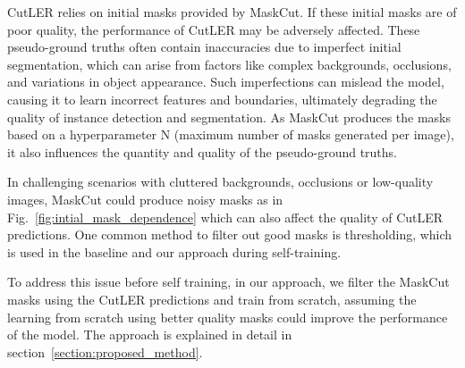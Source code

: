 CutLER relies on initial masks provided by MaskCut. If these initial masks are of poor quality, the performance of CutLER may be adversely affected. These pseudo-ground truths often contain inaccuracies due to imperfect initial segmentation, which can arise from factors like complex backgrounds, occlusions, and variations in object appearance. Such imperfections can mislead the model, causing it to learn incorrect features and boundaries, ultimately degrading the quality of instance detection and segmentation. As MaskCut produces the masks based on a hyperparameter N (maximum number of masks generated per image), it also influences the quantity and quality of the pseudo-ground truths.

In challenging scenarios with cluttered backgrounds, occlusions or low-quality images, MaskCut could produce noisy masks as in Fig.~\ref{fig:intial_mask_dependence} which can also affect the quality of CutLER predictions. One common method to filter out good masks is thresholding, which is used in the baseline and our approach during self-training.


To address this issue before self training, in our approach, we filter the MaskCut masks using the CutLER predictions and train from scratch, assuming the learning from scratch using better quality masks could improve the performance of the model. The approach is explained in detail in section~\ref{section:proposed_method}.

